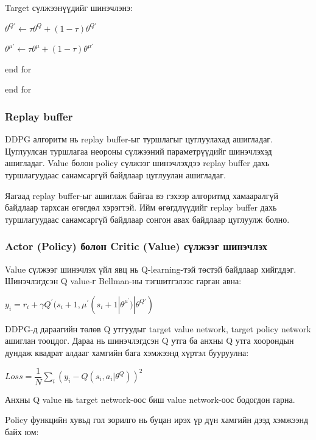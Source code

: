 \documentclass[12pt,A4]{report}
\begin{document}
\quad\quad Target сүлжээнүүдийг шинэчлэнэ:
\begin{center}
$\theta^{Q{'}} \longleftarrow \tau\theta^Q + (1-\tau)\theta^{Q{'}}$ 

$\theta^{\mu{'}} \longleftarrow \tau\theta^\mu + (1-\tau)\theta^{\mu{'}}$ 
\end{center}

\quad\quad end for

\quad end for

\subsubsection{Replay buffer}

DDPG алгоритм нь replay buffer-ыг туршлагыг цуглуулахад ашигладаг. Цуглуулсан туршлагаа неороны сүлжээний параметрүүдийг шинэчлэхэд ашигладаг. Value болон policy сүлжээг шинэчлэхдээ replay buffer дахь туршлагуудаас санамсаргүй байдлаар цуглуулан ашигладаг.

Яагаад replay buffer-ыг ашиглаж байгаа вэ гэхээр алгоритмд хамааралгүй байдлаар тархсан өгөгдөл хэрэгтэй. Ийм өгөгдлүүдийг replay buffer дахь туршлагуудаас санамсаргүй байдлаар сонгон авах байдлаар цуглуулж болно.

\subsubsection{Actor (Policy) болон Critic (Value) сүлжээг шинэчлэх}

Value сүлжээг шинэчлэх үйл явц нь Q-learning-тэй төстэй байдлаар хийгддэг. Шинэчлэгдсэн Q value-г Bellman-ны тэгшитгэлээс гарган авна:

\begin{center}
$y_i=r_i+\gamma{Q^{'}}(s_i+1,\mu^{'}(s_i+1|\theta^{\mu^{'}})|\theta^{Q{'}})$
\end{center}

DDPG-д дараагийн төлөв Q утгуудыг target value network, target policy network ашиглан тооцдог. Дараа нь шинэчлэгдсэн Q утга ба анхны Q утга хоорондын дундаж квадрат алдааг хамгийн бага хэмжээнд хүртэл бууруулна:

\begin{center}
$Loss = \dfrac{1}{N}\sum_{i}(y_i-Q(s_i,a_i|\theta^Q))^2$
\end{center}

Анхны Q value нь target network-оос биш value network-оос бодогдон гарна. 

Policy функцийн хувьд гол зорилго нь буцан ирэх үр дүн хамгийн дээд хэмжээнд байх юм:
\end{document}
